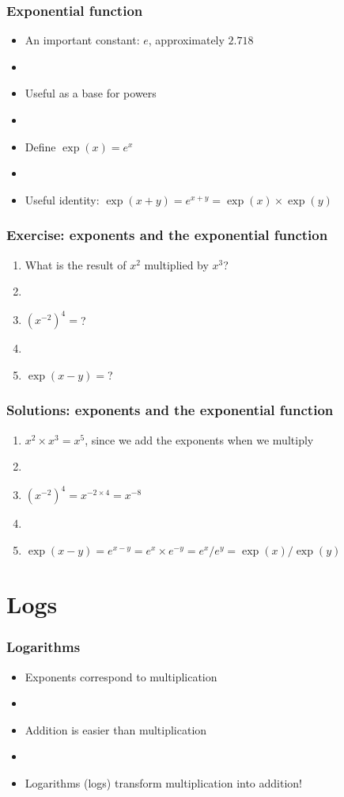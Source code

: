 \documentclass[12pt]{beamer}
\newcommand{\myframe}[1]{\begin{frame} \frametitle{#1}}
\begin{document}
\myframe{Exponential function}
\begin{itemize}
\item An important constant: $e$, approximately $2.718$
\item[]
\item Useful as a base for powers
\item[]
\item Define $\exp(x) = e^x$
\item[]
\item Useful identity: $\exp(x+y) = e^{x+y} =  \exp(x)\times \exp(y)$
\end{itemize}
\end{frame}

\myframe{Exercise: exponents and the exponential function}
\begin{enumerate}
\item What is the result of $x^2$ multiplied by $x^3$?
\item[]
\item $(x^{-2})^4 = $?
\item[]
\item $\exp(x - y) = $?
\end{enumerate}
\end{frame}

\myframe{Solutions: exponents and the exponential function}
\begin{enumerate}
\item $x^2 \times x^3 = x^5$, since we add the exponents when we multiply
\item[]
\item $(x^{-2})^4 = x^{-2 \times 4} = x^{-8}$
\item[]
\item $\exp(x - y) = e^{x - y} = e^x \times e^{-y} = e^x/e^y = \exp(x)/\exp(y)$
\end{enumerate}
\end{frame}

\section{Logs}
\myframe{Logarithms}
\begin{itemize}
\item Exponents correspond to multiplication
\item[]
\item Addition is easier than multiplication
\item[]
\item Logarithms (logs) transform multiplication into addition!
\end{itemize}
\end{frame}
\end{document}
